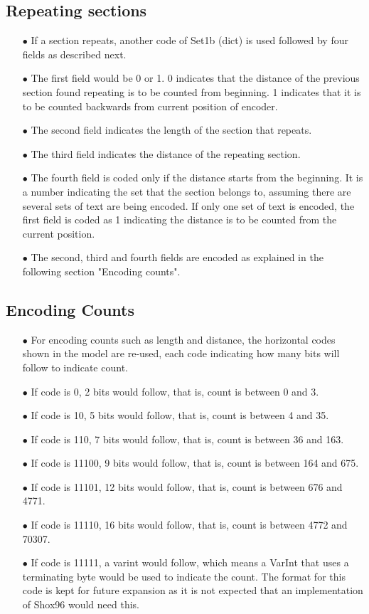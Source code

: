 \documentclass[]{article}
\begin{document}
\subsection{Repeating sections}
\begin{itemize}
	\item[$\bullet$] If a section repeats, another code of Set1b (dict) is used followed by four fields as described next.
	\item[$\bullet$] The first field would be 0 or 1. 0 indicates that the distance of the previous section found repeating is to be counted from beginning. 1 indicates that it is to be counted backwards from current position of encoder.
	\item[$\bullet$] The second field indicates the length of the section that repeats.
	\item[$\bullet$] The third field indicates the distance of the repeating section.
	\item[$\bullet$] The fourth field is coded only if the distance starts from the beginning.  It is a number indicating the set that the section belongs to, assuming there are several sets of text are being encoded.  If only one set of text is encoded, the first field is coded as 1 indicating the distance is to be counted from the current position.
	\item[$\bullet$] The second, third and fourth fields are encoded as explained in the following section "Encoding counts".
\end{itemize}

\subsection{Encoding Counts}
\begin{itemize}
	\item[$\bullet$] For encoding counts such as length and distance, the horizontal codes shown in the model are re-used, each code indicating how many bits will follow to indicate count.
	\item[$\bullet$] If code is 0, 2 bits would follow, that is, count is between 0 and 3.
	\item[$\bullet$] If code is 10, 5 bits would follow, that is, count is between 4 and 35.
	\item[$\bullet$] If code is 110, 7 bits would follow, that is, count is between 36 and 163.
	\item[$\bullet$] If code is 11100, 9 bits would follow, that is, count is between 164 and 675.
	\item[$\bullet$] If code is 11101, 12 bits would follow, that is, count is between 676 and 4771.
	\item[$\bullet$] If code is 11110, 16 bits would follow, that is, count is between 4772 and 70307.
	\item[$\bullet$] If code is 11111, a varint would follow, which means a VarInt that uses a terminating byte would be used to indicate the count.  The format for this code is kept for future expansion as it is not expected that an implementation of Shox96 would need this.
\end{itemize}
\end{document}
